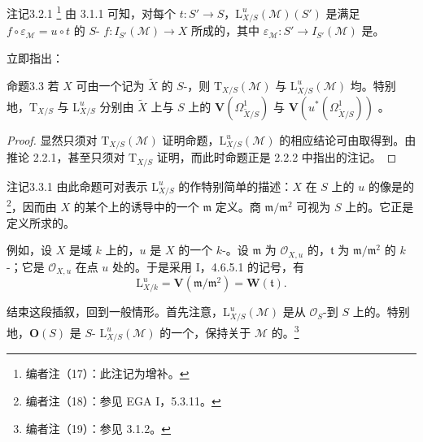 \begin{SGAresult}{注记}{3.2.1}
\footnote{编者注（17）：此注记为增补。} 由 3.1.1 可知，对每个 $t:S'\to S$，$\mathrm L^u_{X/S}(\mathcal M)(S')$ 是满足 $f\circ\varepsilon_{\mathcal M}=u\circ t$ 的 $S$- $f:I_{S'}(\mathcal M)\to X$ 所成的，其中 $\varepsilon_{\mathcal M}:S'\to I_{S'}(\mathcal M)$ 是。
\end{SGAresult}
立即指出：
\begin{SGAresult}{命题}{3.3}
若 $X$ 可由一个记为 $\widetilde X$ 的 $S$-，则 $\mathrm T_{X/S}(\mathcal M)$ 与 $\mathrm L^u_{X/S}(\mathcal M)$ 均。特别地，$\mathrm T_{X/S}$ 与 $\mathrm L^u_{X/S}$ 分别由 $\widetilde X$ 上与 $S$ 上的 $\mathbf V(\Omega^1_{\widetilde X/S})$ 与 $\mathbf V(u^*(\Omega^1_{\widetilde X/S}))$ 。
\end{SGAresult}
\begin{proof}
显然只须对 $\mathrm T_{X/S}(\mathcal M)$ 证明命题，$\mathrm L^u_{X/S}(\mathcal M)$ 的相应结论可由取得到。由推论 2.2.1，甚至只须对 $\mathrm T_{X/S}$ 证明，而此时命题正是 2.2.2 中指出的注记。
\end{proof}
\begin{SGAresult}{注记}{3.3.1}
由此命题可对表示 $\mathrm L^u_{X/S}$ 的作特别简单的描述：$X$ 在 $S$ 上的 $u$ 的像是的\footnote{编者注（18）：参见 EGA I，5.3.11。}，因而由 $X$ 的某个上的诱导中的一个 $\mathfrak m$ 定义。商 $\mathfrak m/\mathfrak m^2$ 可视为 $S$ 上的。它正是定义所求的。

例如，设 $X$ 是域 $k$ 上的，$u$ 是 $X$ 的一个 $k$-。设 $\mathfrak m$ 为 $\mathcal O_{X,u}$ 的，$\mathfrak t$ 为 $\mathfrak m/\mathfrak m^2$ 的 $k$-；它是 $\mathcal O_{X,u}$ 在点 $u$ 处的。于是采用 I，4.6.5.1 的记号，有
\[
\mathrm L^u_{X/k}=\mathbf V(\mathfrak m/\mathfrak m^2)=\mathbf W(\mathfrak t).
\]
\end{SGAresult}
结束这段插叙，回到一般情形。首先注意，$\mathrm L^u_{X/S}(\mathcal M)$ 是从 $\mathcal O_S$-到 $S$ 上的。特别地，$\mathbf O(S)$ 是 $S$- $\mathrm L^u_{X/S}(\mathcal M)$ 的一个，保持关于 $\mathcal M$ 的。\footnote{编者注（19）：参见 3.1.2。}
